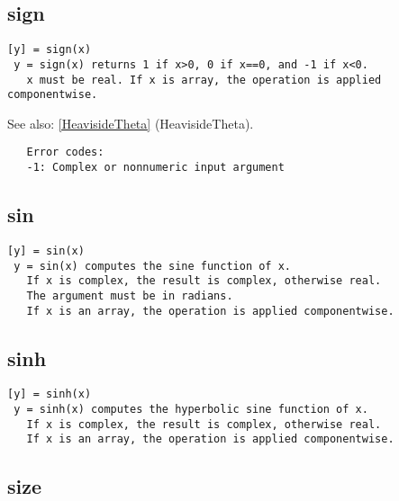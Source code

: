 \documentclass[a4paper]{article}
\begin{document}
\subsection{sign\label{sign}}

\begin{tscreen}
\begin{verbatim}
[y] = sign(x)
 y = sign(x) returns 1 if x>0, 0 if x==0, and -1 if x<0.
   x must be real. If x is array, the operation is applied componentwise.
\end{verbatim}

See also: \ref{HeavisideTheta} {(HeavisideTheta)}.
\begin{verbatim}
   Error codes:
   -1: Complex or nonnumeric input argument 
\end{verbatim}
\end{tscreen}



\subsection{sin\label{sin}}

\begin{tscreen}
\begin{verbatim}
[y] = sin(x)
 y = sin(x) computes the sine function of x.
   If x is complex, the result is complex, otherwise real.
   The argument must be in radians.
   If x is an array, the operation is applied componentwise.
\end{verbatim}
\end{tscreen}



\subsection{sinh\label{sinh}}

\begin{tscreen}
\begin{verbatim}
[y] = sinh(x)
 y = sinh(x) computes the hyperbolic sine function of x.
   If x is complex, the result is complex, otherwise real.
   If x is an array, the operation is applied componentwise.
\end{verbatim}
\end{tscreen}



\subsection{size\label{size}}
\end{document}
